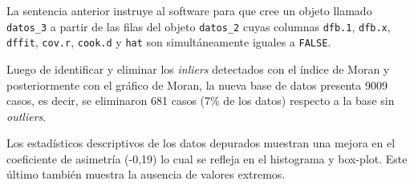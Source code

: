 \documentclass[11pt,b5paper,]{krantz}
\newenvironment{Shaded}{}{}
\newcommand{\CommentTok}[1]{\textcolor[rgb]{0.38,0.63,0.69}{\textit{#1}}}
\newcommand{\DecValTok}[1]{\textcolor[rgb]{0.25,0.63,0.44}{#1}}
\newcommand{\FloatTok}[1]{\textcolor[rgb]{0.25,0.63,0.44}{#1}}
\newcommand{\KeywordTok}[1]{\textcolor[rgb]{0.00,0.44,0.13}{\textbf{#1}}}
\newcommand{\NormalTok}[1]{#1}
\newcommand{\OperatorTok}[1]{\textcolor[rgb]{0.40,0.40,0.40}{#1}}
\newcommand{\OtherTok}[1]{\textcolor[rgb]{0.00,0.44,0.13}{#1}}
\newcommand{\StringTok}[1]{\textcolor[rgb]{0.25,0.44,0.63}{#1}}
\begin{document}
La sentencia anterior instruye al software para que cree un objeto llamado \texttt{datos\_3} a partir de las filas del objeto \texttt{datos\_2} cuyas columnas \texttt{dfb.1}, \texttt{dfb.x}, \texttt{dffit}, \texttt{cov.r}, \texttt{cook.d} y \texttt{hat} son simultáneamente iguales a \texttt{FALSE}.

\begin{Shaded}
\end{Shaded}

Luego de identificar y eliminar los \emph{inliers} detectados con el índice de Moran y posteriormente con el gráfico de Moran, la nueva base de datos presenta 9009 casos, es decir, se eliminaron 681 casos (7\% de los datos) respecto a la base sin \emph{outliers}.

Los estadísticos descriptivos de los datos depurados muestran una mejora en el coeficiente de asimetría (-0,19) lo cual se refleja en el histograma y box-plot. Este último también muestra la ausencia de valores extremos.

\begin{Shaded}
\end{Shaded}
\end{document}
